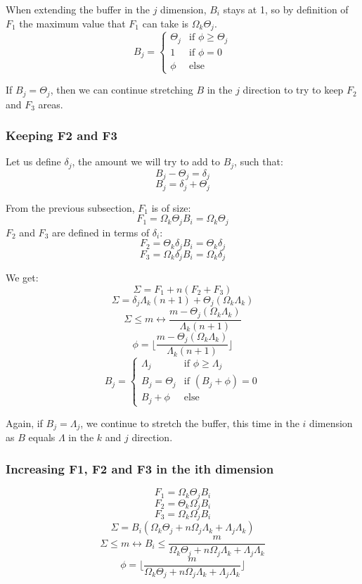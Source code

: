 \documentclass[conference]{IEEEtran}
\begin{document}
When extending the buffer in the $j$ dimension, $B_i$ stays at 1, so by
definition of $F_1$ the maximum value that $F_1$ can take is $\Omega_k\Theta_j$.
$$B_j = \begin{cases}
  \Theta_j & \textrm{if }\phi \geq \Theta_j \\
  1 & \textrm{if }\phi = 0 \\
  \phi & \textrm{else}
\end{cases}$$

If $B_j=\Theta_j$, then we can continue stretching $B$ in the $j$ direction to
try to keep $F_2$ and $F_3$ areas.

\subsubsection{Keeping F2 and F3}

Let us define $\delta_j$, the amount we will try to add to $B_j$, such that:
$$B_j - \Theta_j = \delta_j$$
$$B_j = \delta_j + \Theta_j$$

From the previous subsection, $F_1$ is of size:
$$F_1 = \Omega_k \Theta_j B_i = \Omega_k \Theta_j$$
$F_2$ and $F_3$ are defined in terms of $\delta_i$:
$$F_2 = \Theta_k \delta_j B_i = \Theta_k \delta_j$$
$$F_3 = \Omega_k \delta_j B_i = \Omega_k \delta_j$$

We get:
$$\Sigma = F_1 + n(F_2+F_3)$$
$$\Sigma = \delta_j\Lambda_k(n+1) + \Theta_j(\Omega_k\Lambda_k)$$
$$\Sigma \leq m \leftrightarrow \frac{m-\Theta_j(\Omega_k\Lambda_k)}{\Lambda_k(n+1)}$$
$$\phi = \lfloor \frac{m-\Theta_j(\Omega_k\Lambda_k)}{\Lambda_k(n+1)} \rfloor$$
$$B_j = \begin{cases}
  \Lambda_j & \textrm{if }\phi \geq \Lambda_j \\
  B_j = \Theta_j & \textrm{if }(B_j+\phi) = 0 \\
  B_j + \phi & \textrm{else}
\end{cases}$$

Again, if $B_j=\Lambda_j$, we continue to stretch the buffer, this time in the
$i$ dimension as $B$ equals $\Lambda$ in the $k$ and $j$ direction.

\subsubsection{Increasing F1, F2 and F3 in the ith dimension}
$$F_1 = \Omega_k\Theta_jB_i$$
$$F_2 = \Theta_k\Omega_jB_i$$
$$F_3 = \Omega_k\Omega_jB_i$$
$$\Sigma = B_i(\Omega_k\Theta_j + n\Omega_j\Lambda_k + \Lambda_j\Lambda_k)$$
$$\Sigma \leq m \leftrightarrow B_i \leq \frac{m}{\Omega_k\Theta_j + n\Omega_j\Lambda_k + \Lambda_j\Lambda_k}$$
$$\phi = \lfloor \frac{m}{\Omega_k\Theta_j + n\Omega_j\Lambda_k + \Lambda_j\Lambda_k} \rfloor$$
\end{document}
